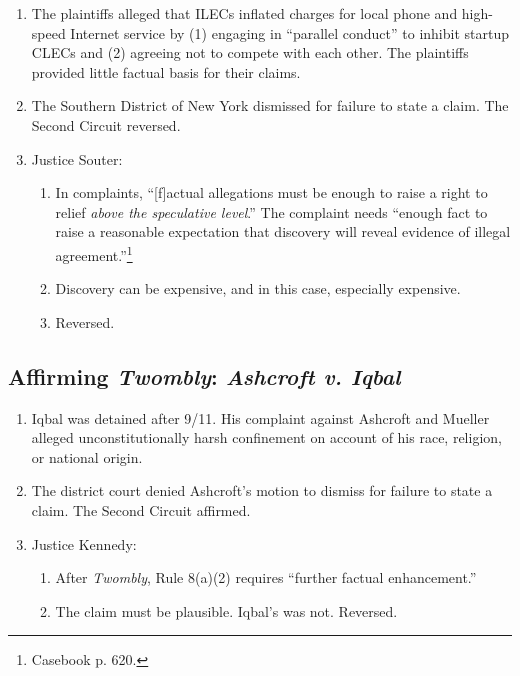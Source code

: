 \begin{enumerate}
    \item The plaintiffs alleged that ILECs inflated charges for local phone 
    and high-speed Internet service by (1) engaging in ``parallel conduct'' to 
    inhibit startup CLECs and (2) agreeing not to compete with each other. The 
    plaintiffs provided little factual basis for their claims.
    \item The Southern District of New York dismissed for failure to state a 
    claim. The Second Circuit reversed.
    \item Justice Souter:
    \begin{enumerate}
        \item In complaints, ``[f]actual allegations must be enough to raise a 
        right to relief \emph{above the speculative 
        level}.'' The complaint needs ``enough fact 
        to raise a reasonable expectation that discovery will reveal evidence 
        of illegal agreement.''\footnote{Casebook p. 620.}
        \item Discovery can be expensive, and in this case, especially 
        expensive.
        \item Reversed.
    \end{enumerate}
\end{enumerate}

\subsection{Affirming \emph{Twombly}: \emph{Ashcroft v. Iqbal}}

\begin{enumerate}
    \item Iqbal was detained after 9/11. His complaint against Ashcroft and 
    Mueller alleged unconstitutionally harsh confinement on account of his 
    race, religion, or national origin.
    \item The district court denied Ashcroft's motion to dismiss for failure 
    to state a claim. The Second Circuit affirmed.
    \item Justice Kennedy:
    \begin{enumerate}
        \item After \emph{Twombly}, Rule 8(a)(2) requires ``further factual 
        enhancement.''
        \item The claim must be plausible. Iqbal's was not. Reversed.
    \end{enumerate}
\end{enumerate}


